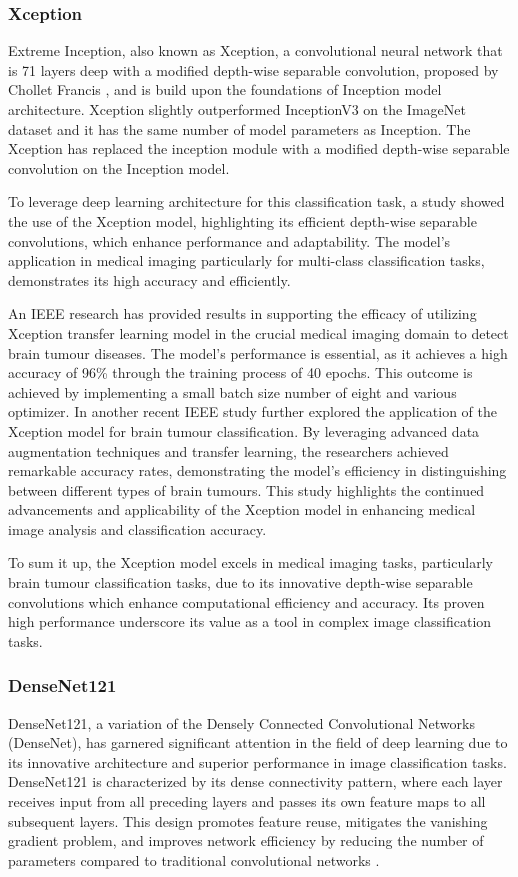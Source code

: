 \subsubsection{Xception}
Extreme Inception, also known as Xception, a convolutional neural network that is 71 layers deep with a modified depth-wise separable convolution, proposed by Chollet Francis \cite{Francois_Chollet_2017}, and is build upon the foundations of Inception model architecture. Xception slightly outperformed InceptionV3 on the ImageNet dataset and it has the same number of model parameters as Inception. The Xception has replaced the inception module with a modified depth-wise separable convolution on the Inception model.

To leverage deep learning architecture for this classification task, a study \cite{Shaojie_2024} showed the use of the Xception model, highlighting its efficient depth-wise separable convolutions, which enhance performance and adaptability. The model's application in medical imaging particularly for multi-class classification tasks, demonstrates its high accuracy and efficiently.

An IEEE research \cite{Kaur_2024} has provided results in supporting the efficacy of utilizing Xception transfer learning model in the crucial medical imaging domain to detect brain tumour diseases. The model's performance is essential, as it achieves a high accuracy of 96\% through the training process of 40 epochs. This outcome is achieved by implementing a small batch size number of eight and various optimizer. In another recent IEEE study \cite{Paranjpe_2023} further explored the application of the Xception model for brain tumour classification. By leveraging advanced data augmentation techniques and transfer learning, the researchers achieved remarkable accuracy rates, demonstrating the model's efficiency in distinguishing between different types of brain tumours. This study highlights the continued advancements and applicability of the Xception model in enhancing medical image analysis and classification accuracy.

To sum it up, the Xception model excels in medical imaging tasks, particularly brain tumour classification tasks, due to its innovative depth-wise separable convolutions which enhance computational efficiency and accuracy. Its proven high performance underscore its value as a tool in complex image classification tasks.

\subsubsection{DenseNet121}
DenseNet121, a variation of the Densely Connected Convolutional Networks (DenseNet)\cite{DenseNet121_2017}, has garnered significant attention in the field of deep learning due to its innovative architecture and superior performance in image classification tasks. DenseNet121 is characterized by its dense connectivity pattern, where each layer receives input from all preceding layers and passes its own feature maps to all subsequent layers. This design promotes feature reuse, mitigates the vanishing gradient problem, and improves network efficiency by reducing the number of parameters compared to traditional convolutional networks .

